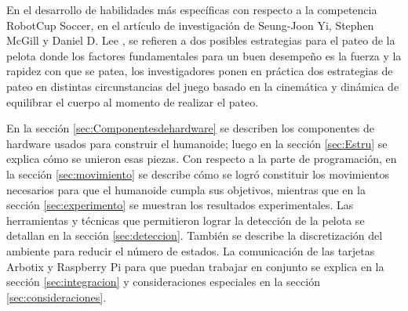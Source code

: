 En el desarrollo de habilidades más específicas con respecto a la competencia RobotCup Soccer, en el artículo de investigación de Seung-Joon Yi, Stephen McGill y Daniel D. Lee  \cite{paper2}, se refieren a dos posibles estrategias para el pateo de la pelota donde los factores fundamentales para un buen desempeño es la fuerza y la rapidez con que se patea, los investigadores ponen en pr\'actica dos estrategias de pateo en distintas circunstancias del juego basado en la cinemática y dinámica de equilibrar el cuerpo al momento de realizar el pateo.

En la secci\'on \ref{sec:Componentesdehardware} se describen los componentes de hardware usados para construir el humanoide; luego en la sección \ref{sec:Estru}
se explica cómo se unieron esas piezas. Con respecto a la parte de programación, en la secci\'on \ref{sec:movimiento} se describe c\'omo se logró constituir los movimientos necesarios para que el humanoide cumpla sus objetivos, mientras que en la secci\'on \ref{sec:experimento} se muestran los resultados experimentales. Las herramientas y técnicas  que  permitieron lograr  la detección de la pelota se detallan en la secci\'on \ref{sec:deteccion}. También se describe la discretización del ambiente para reducir el n\'umero de estados. La comunicación de las tarjetas Arbotix y Raspberry Pi para que puedan trabajar en conjunto se explica en la secci\'on \ref{sec:integracion}  y consideraciones especiales en la secci\'on \ref{sec:consideraciones}.
